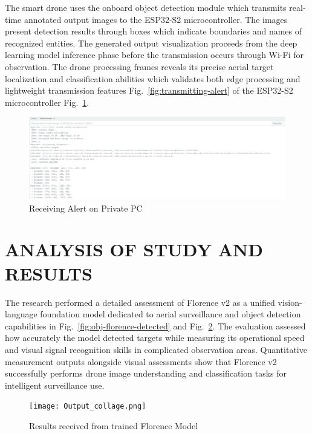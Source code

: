 \documentclass[fleqn,10pt,lineno]{wlpeerj}
\begin{document}
The smart drone uses the onboard object detection module which transmits real-time annotated output images to the ESP32-S2 microcontroller. The images present detection results through boxes which indicate boundaries and names of recognized entities. The generated output visualization proceeds from the deep learning model inference phase before the transmission occurs through Wi-Fi for observation. The drone processing frames reveals its precise aerial target localization and classification abilities which validates both edge processing and lightweight transmission features Fig.~\ref{fig:transmitting-alert} of the ESP32-S2 microcontroller Fig.~\ref{fig:receiving-alert}. 

\begin{figure}[H]
    \centering
    \includegraphics[width=1\linewidth]{transmit_2.png}
    \caption{Receiving Alert on Private PC}
    \label{fig:receiving-alert}
    
\end{figure}

\section{ANALYSIS OF STUDY AND RESULTS}

The research performed a detailed assessment of Florence v2 as a unified vision-language foundation model dedicated to aerial surveillance and object detection capabilities in Fig.~\ref{fig:obj-florence-detected} and Fig.~\ref{fig:results-detected}. The evaluation assessed how accurately the model detected targets while measuring its operational speed and visual signal recognition skills in complicated observation areas. Quantitative measurement outputs alongside visual assessments show that Florence v2 successfully performs drone image understanding and classification tasks for intelligent surveillance use.

\begin{figure}
    \centering
    \texttt{[image: Output\_collage.png]}
    \caption{Results received from trained Florence Model}
    \label{fig:results-detected}
\end{figure}
\end{document}
